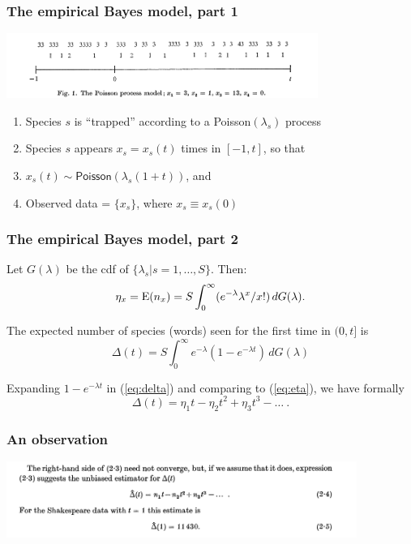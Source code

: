 \begin{frame}
    \frametitle{The empirical Bayes model, part 1}
    \begin{center}
        \includegraphics[width=4in]{../compendium/Figures/ET-Figure1.pdf}        
    \end{center}
	\begin{enumerate}
		\item Species $s$ is ``trapped'' according to a Poisson$(\lambda_s)$ process
		\item Species $s$ appears $x_s=x_s(t)$ times in $[-1,t]$, so that
		\item $x_s(t) \sim \mathsf{Poisson}(\lambda_s(1+t))$, and
		\item Observed data = $\{x_s\}$, where $x_s\equiv x_s(0)$
	\end{enumerate}

\end{frame}

\begin{frame}
    \frametitle{The empirical Bayes model, part 2}
	Let $G(\lambda)$ be the cdf of $\{\lambda_s \vert s=1,\dots,S\}$. Then:
	\begin{equation}
		\eta_x = \mbox{E}(n_x) = S\int_0^\infty (e^{-\lambda}\lambda^x/x!)\,dG(\lambda).
		\label{eq:eta}
	\end{equation}
	
	
	The expected number of species (words) seen for the first time in $(0,t]$ is
	\begin{equation}
		\Delta(t) = S\int_0^\infty e^{-\lambda}(1-e^{-\lambda t})\,dG(\lambda)
		\label{eq:delta}
	\end{equation}
	
	Expanding $1-e^{-\lambda t}$ in (\ref{eq:delta}) and comparing to (\ref{eq:eta}), we have formally
	\begin{equation}
		\Delta(t) = \eta_1 t-\eta_2 t^2 + \eta_3 t^3 - \ldots\ .
	\end{equation}
\end{frame}

\begin{frame}
	\frametitle{An observation}
	\begin{center}
		\includegraphics[width=4.5in]{../compendium/Figures/ET-eqns-(2_4)-and-(2_5).pdf}
	\end{center}
\end{frame}


